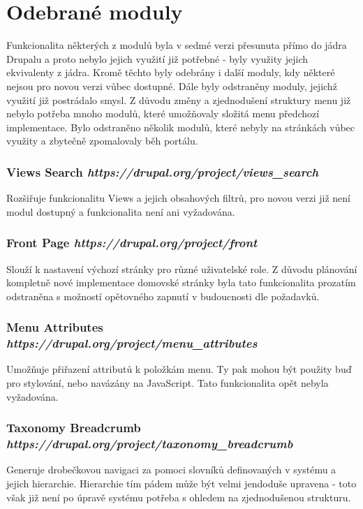 \section{Odebrané moduly}
Funkcionalita některých z modulů byla v sedmé verzi přesunuta přímo do jádra Drupalu a proto nebylo jejich využití již potřebné - byly využity jejich ekvivalenty z jádra. Kromě těchto byly odebrány i další moduly, kdy některé nejsou pro novou verzi vůbec dostupné. Dále byly odstraněny moduly, jejichž využití již postrádalo smysl. Z důvodu změny a zjednodušení struktury menu již nebylo potřeba mnoho modulů, které umožňovaly složitá menu předchozí implementace. Bylo odstraněno několik modulů, které nebyly na stránkách vůbec využity a zbytečně zpomalovaly běh portálu. 

\subsubsection*{\textbf{Views Search} \hfill \emph{https://drupal.org/project/views\_search}}
Rozšiřuje funkcionalitu Views a jejich obsahových filtrů, pro novou verzi již není modul dostupný a funkcionalita není ani vyžadována.

\subsubsection*{\textbf{Front Page} \hfill \emph{https://drupal.org/project/front}}
Slouží k nastavení výchozí stránky pro různé uživatelské role. Z důvodu plánování kompletně nové implementace domovské stránky byla tato funkcionalita prozatím odstraněna s možností opětovného zapnutí v budoucnosti dle požadavků.

\subsubsection*{\textbf{Menu Attributes} \hfill \emph{https://drupal.org/project/menu\_attributes}}
Umožňuje přiřazení attributů k položkám menu. Ty pak mohou být použity buď pro stylování, nebo navázány na JavaScript. Tato funkcionalita opět nebyla vyžadována.

\subsubsection*{\textbf{Taxonomy Breadcrumb} \hfill \emph{https://drupal.org/project/taxonomy\_breadcrumb}}
Generuje drobečkovou navigaci za pomoci slovníků definovaných v systému a jejich hierarchie. Hierarchie tím pádem může být velmi jendoduše upravena - toto však již není po úpravě systému potřeba s ohledem na zjednodušenou strukturu.

